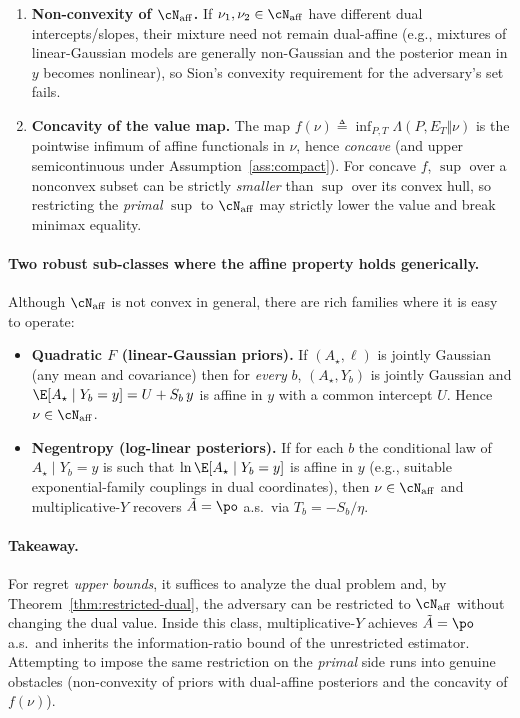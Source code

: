 \begin{enumerate}
    \item \textbf{Non-convexity of $\cN_{\mathrm{aff}}$.} If $\nu_1,\nu_2\in\cN_{\mathrm{aff}}$ have different dual intercepts/slopes, their mixture need not remain dual-affine (e.g., mixtures of linear-Gaussian models are generally non-Gaussian and the posterior mean in $y$ becomes nonlinear), so Sion's convexity requirement for the adversary's set fails.

    \item \textbf{Concavity of the value map.} The map
          $f(\nu)\triangleq \inf_{P,T}\Lambda(P,E_T\Vert\nu)$ is the pointwise infimum of affine functionals in $\nu$, hence \emph{concave} (and upper semicontinuous under Assumption~\ref{ass:compact}). For concave $f$, $\sup$ over a nonconvex subset can be strictly \emph{smaller} than $\sup$ over its convex hull, so restricting the \emph{primal} $\sup$ to $\cN_{\mathrm{aff}}$ may strictly lower the value and break minimax equality.
\end{enumerate}

\paragraph{Two robust sub-classes where the affine property holds generically.}
Although $\cN_{\mathrm{aff}}$ is not convex in general, there are rich families where it is easy to operate:

\begin{itemize}
    \item \textbf{Quadratic $F$ (linear-Gaussian priors).} If $(A_\star,\ell)$ is jointly Gaussian (any mean and covariance) then for \emph{every} $b$,
          $(A_\star,Y_b)$ is jointly Gaussian and $\E[A_\star\mid Y_b=y]=U+S_b\,y$ is affine in $y$ with a common intercept $U$. Hence $\nu\in\cN_{\mathrm{aff}}$.

    \item \textbf{Negentropy (log-linear posteriors).} If for each $b$ the conditional law of $A_\star\mid Y_b=y$ is such that
          $\ln\E[A_\star\mid Y_b=y]$ is affine in $y$ (e.g., suitable exponential-family couplings in dual coordinates), then $\nu\in\cN_{\mathrm{aff}}$ and multiplicative-$Y$ recovers $\tilde{A}=\po$ a.s.\ via $T_b=-S_b/\eta$.
\end{itemize}

\paragraph{Takeaway.}
For regret \emph{upper bounds}, it suffices to analyze the dual problem and, by Theorem~\ref{thm:restricted-dual}, the adversary can be restricted to $\cN_{\mathrm{aff}}$ without changing the dual value. Inside this class, multiplicative-$Y$ achieves $\tilde{A}=\po$ a.s.\ and inherits the information-ratio bound of the unrestricted estimator. Attempting to impose the same restriction on the \emph{primal} side runs into genuine obstacles (non-convexity of priors with dual-affine posteriors and the concavity of $f(\nu)$).

